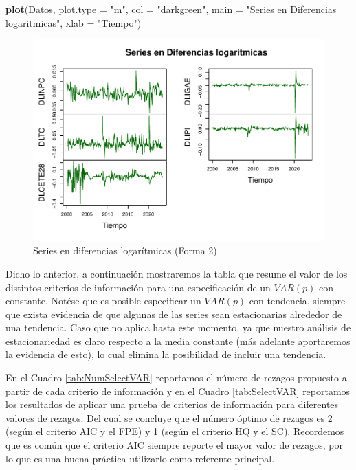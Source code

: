 \documentclass[
]{book}
\newenvironment{Shaded}{\begin{snugshade}}{\end{snugshade}}
\newcommand{\AttributeTok}[1]{\textcolor[rgb]{0.13,0.29,0.53}{#1}}
\newcommand{\FunctionTok}[1]{\textcolor[rgb]{0.13,0.29,0.53}{\textbf{#1}}}
\newcommand{\NormalTok}[1]{#1}
\newcommand{\StringTok}[1]{\textcolor[rgb]{0.31,0.60,0.02}{#1}}
\begin{document}
\begin{Shaded}
\begin{Highlighting}[]
\FunctionTok{plot}\NormalTok{(Datos, }\AttributeTok{plot.type =} \StringTok{"m"}\NormalTok{, }
     \AttributeTok{col =} \StringTok{"darkgreen"}\NormalTok{, }
     \AttributeTok{main =} \StringTok{"Series en Diferencias logaritmicas"}\NormalTok{, }\AttributeTok{xlab =} \StringTok{"Tiempo"}\NormalTok{)}
\end{Highlighting}
\end{Shaded}

\begin{figure}

{\centering \includegraphics{Notas-Series-Tiempo_files/figure-latex/fig63-1} 

}

\caption{Series en diferencias logarítmicas (Forma 2)}\label{fig:fig63}
\end{figure}

Dicho lo anterior, a continuación mostraremos la tabla que resume el valor de los distintos criterios de información para una especificación de un \(VAR(p)\) con constante. Notése que es posible especificar un \(VAR(p)\) con tendencia, siempre que exista evidencia de que algunas de las series sean estacionarias alrededor de una tendencia. Caso que no aplica hasta este momento, ya que nuestro análisis de estacionariedad es claro respecto a la media constante (más adelante aportaremos la evidencia de esto), lo cual elimina la posibilidad de incluir una tendencia.

En el Cuadro \ref{tab:NumSelectVAR} reportamos el número de rezagos propuesto a partir de cada criterio de información y en el Cuadro \ref{tab:SelectVAR} reportamos los resultados de aplicar una prueba de criterios de información para diferentes valores de rezagos. Del cual se concluye que el número óptimo de rezagos es 2 (según el criterio AIC y el FPE) y 1 (según el criterio HQ y el SC). Recordemos que es común que el criterio AIC siempre reporte el mayor valor de rezagos, por lo que es una buena práctica utilizarlo como referente principal.
\end{document}
